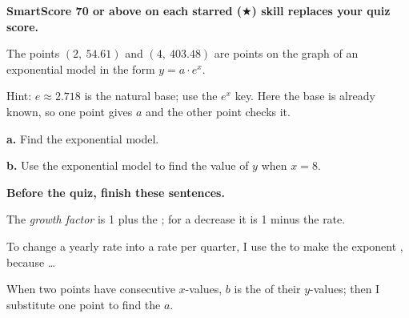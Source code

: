 \vspace{2pt}
\textbf{SmartScore 70 or above on each starred ($\bigstar$) skill replaces your quiz score.}

The points $(2,\ 54.61)$ and $(4,\ 403.48)$ are points on the graph of an exponential model in the form $y=a\cdot e^x$.

Hint: $e\approx2.718$ is the natural base; use the $e^x$ key. Here the base is already known, so one point gives $a$ and the other point checks it.

\begin{minipage}[t]{0.48\textwidth}
\textbf{a.} Find the exponential model.\lines[3]
\end{minipage}\hfill
\begin{minipage}[t]{0.48\textwidth}
\textbf{b.} Use the exponential model to find the value of $y$ when $x=8$.\lines[3]
\end{minipage}

\vspace{6pt}
\textbf{Before the quiz, finish these sentences.}

The \emph{growth factor} is 1 plus the \blank[2.8cm]; for a decrease it is 1 minus the rate.

To change a yearly rate into a rate per quarter, I use the \blank[4.2cm] to make the exponent \blank[1.4cm], because \dots\lines[1]

When two points have consecutive $x$-values, $b$ is the \blank[2.4cm] of their $y$-values; then I substitute one point to find the \blank[2.8cm] $a$.


